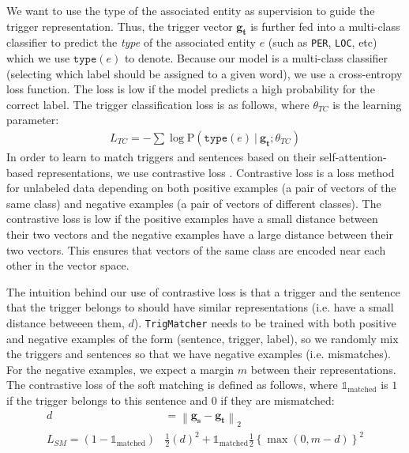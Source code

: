We want to use the type of the associated entity as supervision to guide the trigger representation.
Thus, the trigger vector $\mathbf{g_t}$ is further fed into a multi-class classifier to predict the \textit{type} of the associated entity $e$ (such as \texttt{PER}, \texttt{LOC}, etc) which we use $\texttt{type}(e)$ to denote. Because our model is a multi-class classifier (selecting which label should be assigned to a given word), we use a cross-entropy loss function.  The loss is low if the model predicts a high probability for the correct label.
The trigger classification loss is as follows, where $\theta_{TC}$ is the learning parameter:
{
	{  
		\begin{align*} 
		L_{TC}=-\sum \log \mathrm{P} \left(\texttt{type}(e)~|~ \mathbf{g_t}; \theta_{TC}\right) 
		\end{align*} 
	}
}  
In order to learn to match triggers and sentences based on their self-attention-based representations, we use contrastive loss \citep{hadsell2006dimensionality}. 
Contrastive loss is a loss method for unlabeled data depending on both positive examples (a pair of vectors of the same class) and negative examples (a pair of vectors of different classes). The contrastive loss is low if the positive examples have a small distance between their two vectors and the negative examples have a large distance between their two vectors. This ensures that vectors of the same class are encoded near each other in the vector space.

The intuition behind our use of contrastive loss is that a trigger and the sentence that the trigger belongs to should have similar representations (i.e. have a small distance betweeen them, $d$).
\texttt{TrigMatcher} needs to be trained with both positive and negative examples of the form (sentence, trigger, label), so we randomly mix the triggers and sentences so that we have negative examples (i.e. mismatches). 
For the negative examples, we expect a margin $m$ between their representations. 
The contrastive loss of the soft matching is defined as follows, where $\mathds{1}_{\text{matched}}$ is $1$ if the trigger belongs to this sentence and $0$ if they are mismatched:
{
	{
		\begin{align*}  
		d&=\left\|\mathbf{g_s}-\mathbf{g_t}\right\|_{2}\\
			L_{SM} = (1-\mathds{1}_{\text{matched}}) &\frac{1}{2}\left(d\right)^{2}+\mathds{1}_{\text{matched}} \frac{1}{2}\left\{\max \left(0, m-d\right)\right\}^{2}
		\end{align*} 
	}
}  

